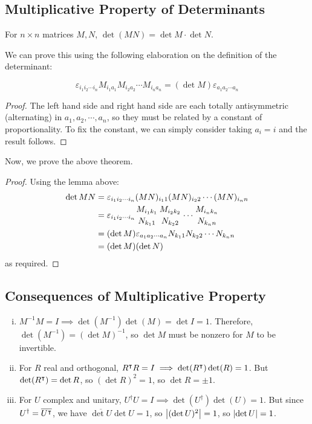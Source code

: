 \documentclass{article}
\begin{document}
\subsection{Multiplicative Property of Determinants}
\begin{theorem}
    For $n\times n$ matrices $M, N$, $\det (MN) = \det M \cdot \det N$.
\end{theorem}
\noindent We can prove this using the following elaboration on the definition of the determinant:
\begin{lemma}
    \[ \varepsilon_{i_1 i_2 \cdots i_n} M_{i_1 a_1} M_{i_2 a_2} \cdots M_{i_n a_n} = (\det M) \varepsilon_{a_1 a_2 \cdots a_n} \]
\end{lemma}
\begin{proof}
    The left hand side and right hand side are each totally antisymmetric (alternating) in $a_1, a_2, \cdots, a_n$, so they must be related by a constant of proportionality. To fix the constant, we can simply consider taking $a_i = i$ and the result follows.
\end{proof}
\noindent Now, we prove the above theorem.
\begin{proof}
    Using the lemma above:
    \begin{align*}
        \det MN & = \varepsilon_{i_1 i_2 \cdots i_n} (MN)_{i_1 1} (MN)_{i_2 2} \cdots (MN)_{i_n n}                                                    \\
                & = \varepsilon_{i_1 i_2 \cdots i_n} {M_{i_1 k_1} \atop N_{k_1 1}} {M_{i_2 k_2} \atop N_{k_2 2}} \cdots {M_{i_n k_n} \atop N_{k_n n}} \\
                & = (\det M) \varepsilon_{a_1 a_2 \cdots a_n} N_{k_1 1} N_{k_2 2} \cdots N_{k_n n}                                                    \\
                & = (\det M)(\det N)
    \end{align*}
    as required.
\end{proof}

\subsection{Consequences of Multiplicative Property}
\begin{enumerate}[(i)]
    \item $M^{-1}M = I \implies \det(M^{-1}) \det(M) = \det I = 1$. Therefore, $\det (M^{-1}) = (\det M)^{-1}$, so $\det M$ must be nonzero for $M$ to be invertible.
    \item For $R$ real and orthogonal, $R^\intercal R = I \implies \det(R^\intercal) \det(R) = 1$. But $\det (R^\intercal) = \det R$, so $(\det R)^2 = 1$, so $\det R = \pm 1$.
    \item For $U$ complex and unitary, $U^\dagger U = I \implies \det(U^\dagger) \det(U) = 1$. But since $U^\dagger = \overline{U^\intercal}$, we have $\overline{\det U} \det U = 1$, so $\abs{(\det U)^2} = 1$, so $\abs{\det U} = 1$.
\end{enumerate}
\end{document}

